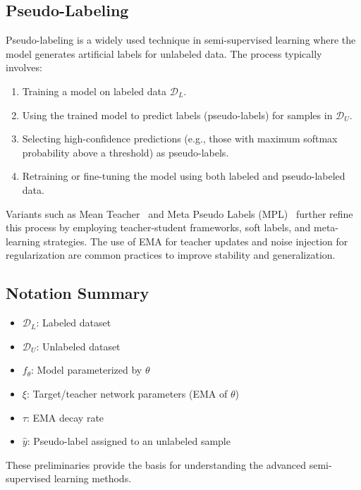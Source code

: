 \subsection{Pseudo-Labeling}

Pseudo-labeling is a widely used technique in semi-supervised learning where the model generates artificial labels for unlabeled data. The process typically involves:

\begin{enumerate}
    \item Training a model on labeled data $\mathcal{D}_L$.
    \item Using the trained model to predict labels (pseudo-labels) for samples in $\mathcal{D}_U$.
    \item Selecting high-confidence predictions (e.g., those with maximum softmax probability above a threshold) as pseudo-labels.
    \item Retraining or fine-tuning the model using both labeled and pseudo-labeled data.
\end{enumerate}

Variants such as Mean Teacher~\cite{tarvainen2017mean} and Meta Pseudo Labels (MPL)~\cite{lee2019meta} further refine this process by employing teacher-student frameworks, soft labels, and meta-learning strategies. The use of EMA for teacher updates and noise injection for regularization are common practices to improve stability and generalization.

\subsection{Notation Summary}

\begin{itemize}
    \item $\mathcal{D}_L$: Labeled dataset
    \item $\mathcal{D}_U$: Unlabeled dataset
    \item $f_\theta$: Model parameterized by $\theta$
    \item $\xi$: Target/teacher network parameters (EMA of $\theta$)
    \item $\tau$: EMA decay rate
    \item $\hat{y}$: Pseudo-label assigned to an unlabeled sample
\end{itemize}

These preliminaries provide the basis for understanding the advanced semi-supervised learning methods.

